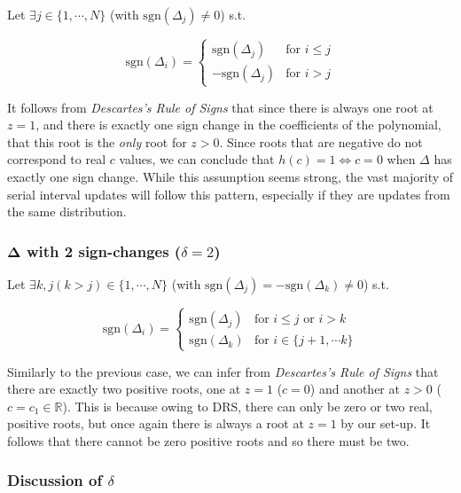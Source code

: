 \documentclass[10pt,journal,compsoc]{IEEEtran}
\begin{document}
Let $\exists j \in \{ 1, \cdots,  N \}$ (with $\mathrm{sgn}(\Delta_j) \neq 0$) s.t.

\begin{equation}
  \mathrm{sgn}(\Delta_i) =
    \begin{cases}
      \mathrm{sgn}(\Delta_j) & \text{for } i \leq j\\
      -\mathrm{sgn}(\Delta_j) & \text{for } i > j
    \end{cases}       
\end{equation}

It follows from \textit{Descartes's Rule of Signs} that since there is always one root at $z=1$, and there is exactly one sign change in the coefficients of the polynomial, that this root is the \textit{only} root for $z>0$. Since roots that are negative do not correspond to real $c$ values, we can conclude that $h(c) = 1 \iff c = 0$ when $\Delta$ has exactly one sign change. While this assumption seems strong, the vast majority of serial interval updates will follow this pattern, especially if they are updates from the same distribution.

\subsubsection*{$\boldsymbol{\Delta}$ with 2 sign-changes ($\delta = 2$)}

Let $\exists k, j (k>j) \in \{ 1, \cdots,  N \}$ (with $\mathrm{sgn}(\Delta_j) = -\mathrm{sgn}(\Delta_k) \neq 0 $) s.t.


\begin{equation}
  \mathrm{sgn}(\Delta_i) =
    \begin{cases}
      \mathrm{sgn}(\Delta_j) & \text{for } i \leq j \text{ or } i > k\\
      \mathrm{sgn}(\Delta_k) & \text{for } i \in \{ j+1, \cdots k \}
    \end{cases}       
\end{equation}

Similarly to the previous case, we can infer from \textit{Descartes's Rule of Signs} that there are exactly two positive roots, one at $z=1$ ($c = 0$) and another at $z>0$ ($c = c_1 \in \mathbb{R}$). This is because owing to DRS, there can only be zero or two real, positive roots, but once again there is always a root at $z=1$ by our set-up. It follows that there cannot be zero positive roots and so there must be two.\\

\subsubsection*{Discussion of $\delta$}
\end{document}
